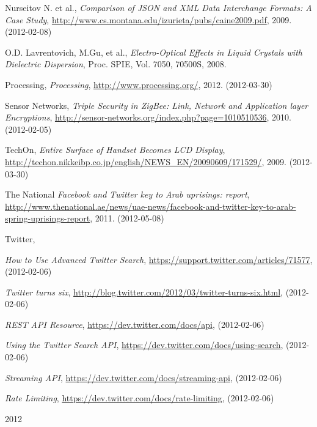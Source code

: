 \documentclass[a4paper,11pt]{article}
\newcounter{qcounter}
\begin{document}
\begin{thebibliography}{9}
\label{paulson}
    Nurseitov N. et al.,
    \emph{Comparison of JSON and XML Data Interchange Formats: A Case Study},
    \url{http://www.cs.montana.edu/izurieta/pubs/caine2009.pdf},
    2009. (2012-02-08)

\label{lavrentovich}
    O.D. Lavrentovich, M.Gu, et al.,
    \emph{Electro-Optical Effects in Liquid Crystals with Dielectric Dispersion},
    Proc. SPIE, 
    Vol. 7050, 70500S,
    2008.

\label{processing}
    Processing,
    \emph{Processing},
    \url{http://www.processing.org/},
    2012. (2012-03-30)

\label{sensornetworks}
    Sensor Networks,
    \emph{Triple Security in ZigBee: Link, Network and Application layer Encryptions},
    \url{http://sensor-networks.org/index.php?page=1010510536},
    2010. (2012-02-05)

\label{techon}
    TechOn,
    \emph{Entire Surface of Handset Becomes LCD Display},
    \url{http://techon.nikkeibp.co.jp/english/NEWS_EN/20090609/171529/},
    2009. (2012-03-30)

\label{national}
    The National
    \emph{Facebook and Twitter key to Arab uprisings: report},
    \url{http://www.thenational.ae/news/uae-news/facebook-and-twitter-key-to-arab-spring-uprisings-report},
    2011. (2012-05-08)

\label{twitter}
    Twitter,
    \begin{list}{[]}{}
    \item \emph{How to Use Advanced Twitter Search}, \url{https://support.twitter.com/articles/71577}, (2012-02-06)
    \item \emph{Twitter turns six}, \url{http://blog.twitter.com/2012/03/twitter-turns-six.html}, (2012-02-06)
    \item \emph{REST API Resource}, \url{https://dev.twitter.com/docs/api}, (2012-02-06)
    \item \emph{Using the Twitter Search API}, \url{https://dev.twitter.com/docs/using-search}, (2012-02-06)
    \item \emph{Streaming API}, \url{https://dev.twitter.com/docs/streaming-api}, (2012-02-06)
    \item \emph{Rate Limiting}, \url{https://dev.twitter.com/docs/rate-limiting}, (2012-02-06)
    \end{list}
    2012


\end{thebibliography}
\end{document}
